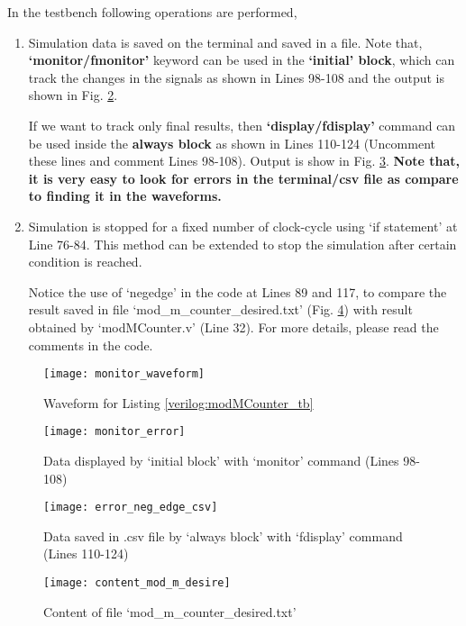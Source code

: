 \begin{explanation}
	In the testbench following operations are performed, 
	\begin{enumerate}
		\item Simulation data is saved on the terminal and saved in a file. Note that, \textbf{`monitor/fmonitor'} keyword can be used in the \textbf{`initial' block}, which can track the changes in the signals as shown in Lines 98-108 and the output is shown in Fig. \ref{fig:monitor_error}. 
		
		If we want to track only final results, then \textbf{`display/fdisplay'} command can be used inside the \textbf{always block} as shown in Lines 110-124 (Uncomment these lines and comment Lines 98-108). Output is show in Fig. \ref{fig:error_neg_edge_csv}. \textbf{Note that, it is very easy to look for errors in the terminal/csv file as compare to finding it in the waveforms.} 
		
		\item Simulation is stopped for a fixed number of clock-cycle using `if statement' at Line 76-84. This method can be extended to stop the simulation after certain condition is reached.
		
		\begin{noNumBox}
			Notice the use of `negedge' in the code at Lines 89 and 117, to compare the result saved in file `mod\_m\_counter\_desired.txt' (Fig. \ref{fig:content_mod_m_desire}) with result obtained by `modMCounter.v' (Line 32). For more details, please read the comments in the code. 
		\end{noNumBox}
	\end{enumerate}
	
	
	\begin{figure}[!h]
		\centering
		\texttt{[image: monitor\_waveform]}
		\caption{Waveform for Listing \ref{verilog:modMCounter_tb}}
		\label{fig:monitor_waveform}
	\end{figure}
	
	\begin{figure}[!h]
		\centering
		\texttt{[image: monitor\_error]}
		\caption{Data displayed by `initial block' with `monitor' command (Lines 98-108)}
		\label{fig:monitor_error}
	\end{figure}
	
	\begin{figure}[!h]
		\centering
		\texttt{[image: error\_neg\_edge\_csv]}
		\caption{Data saved in .csv file by `always block' with `fdisplay' command (Lines 110-124)}
		\label{fig:error_neg_edge_csv}
	\end{figure}
	
	\begin{figure}[!h]
		\centering
		\texttt{[image: content\_mod\_m\_desire]}
		\caption{Content of file `mod\_m\_counter\_desired.txt' }
		\label{fig:content_mod_m_desire}
	\end{figure}
	
\end{explanation}

